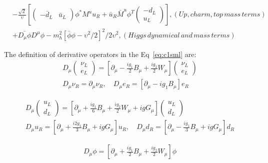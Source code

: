 \begin{equation}
\begin{alignedat}{2}
      & -\frac{\sqrt{2}}{\upsilon}[\begin{pmatrix} -\bar{d}_{L} & \bar{u}_{L} \end{pmatrix}\phi^{*} M^{u}u_{R} + \bar{u}_{R}\bar{M}^{u}\phi^{T}\begin{pmatrix} -d_{L} \\ u_{L} \end{pmatrix}], (Up, charm, top \, mass \, terms) \\
      & +\bar{D_{\mu}\phi}D^{\mu}\phi - m_{h}^{2}[\bar{\phi}\phi-\upsilon^{2}/2]^{2}/2\upsilon^{2}, (Higgs \, dynamical \, and \, mass \, terms)
  \label{eq:c1sml}
  \end{alignedat}
\end{equation}

The definition of derivative operators in the Eq~\ref{eq:c1sml} are:
\begin{equation}
  \begin{aligned}
  D_{\mu}\begin{pmatrix} \nu_{L} \\ e_{L} \end{pmatrix} = [\partial_{\mu}-\frac{ig_{1}}{2}B_{\mu}+\frac{ig_{2}}{2}W_{\mu}]\begin{pmatrix} \nu_{L} \\ e_{L} \end{pmatrix} \\
  D_{\mu}\nu_{R} = \partial_{\mu}\nu_{R},\quad D_{\mu}e_{R} = [\partial_{\mu}-ig_{1}B_{\mu}]e_{R}
  \end{aligned}
  \label{eq:c1smldl}
\end{equation}

\begin{equation}
  \begin{aligned}
  D_{\mu}\begin{pmatrix} u_{L} \\ d_{L} \end{pmatrix} = [\partial_{\mu}+\frac{ig_{1}}{6}B_{\mu}+\frac{ig_{2}}{2}W_{\mu}+igG_{\mu}]\begin{pmatrix} u_{L} \\ d_{L} \end{pmatrix} \\
  D_{\mu}u_{R} = [\partial_{\mu}+\frac{i2g_{1}}{3}B_{\mu}+igG_{\mu}]u_{R},\quad D_{\mu}d_{R} = [\partial_{\mu}-\frac{ig_{1}}{3}B_{\mu}+igG_{\mu}]d_{R}
  \end{aligned}
  \label{eq:c1smldq}
\end{equation}

\begin{equation}
  \begin{aligned}
  D_{\mu}\phi = [\partial_{\mu}+\frac{ig_{1}}{2}B_{\mu}+\frac{ig_{2}}{2}W_{\mu}]\phi
  \end{aligned}
  \label{eq:c1smldh}
\end{equation}



